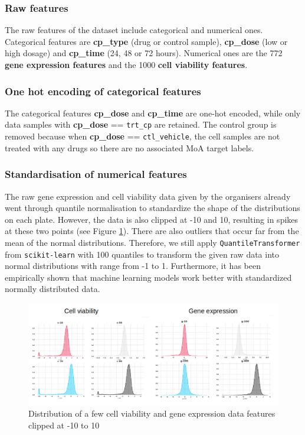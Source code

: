 \documentclass{article}
\begin{document}
\subsubsection{Raw features}
The raw features of the dataset include categorical and numerical ones. Categorical features are \textbf{cp\_type} (drug or control sample), \textbf{cp\_dose} (low or high dosage) and \textbf{cp\_time} (24, 48 or 72 hours). Numerical ones are the 772 \textbf{gene expression features} and the 1000 \textbf{cell viability features}. 

\subsubsection{One hot encoding of categorical features}
The categorical features \textbf{cp\_dose} and \textbf{cp\_time} are one-hot encoded, while only data samples with \textbf{cp\_dose} == \texttt{trt\_cp} are retained. The control group is removed because when \textbf{cp\_dose} == \texttt{ctl\_vehicle}, the cell samples are not treated with any drugs so there are no associated MoA target labels.

\subsubsection{Standardisation of numerical features}
The raw gene expression and cell viability data given by the organisers already went through quantile normalisation to standardize the shape of the distributions on each plate. However, the data is also clipped at -10 and 10, resulting in spikes at these two points (see Figure \ref{fig:raw_distrib}). There are also outliers that occur far from the mean of the normal distributions. Therefore, we still apply \texttt{QuantileTransformer} from \texttt{scikit-learn} with 100 quantiles to transform the given raw data into normal distributions with range from -1 to 1. Furthermore, it has been empirically shown that machine learning models work better with standardized normally distributed data.

\begin{figure}[H]
\begin{center}
	\includegraphics[width=1\textwidth]{pics/raw_distrib.png}
    \caption{Distribution of a few cell viability and gene expression data features clipped at -10 to 10}
\label{fig:raw_distrib}
\end{center}
\end{figure}
\end{document}
